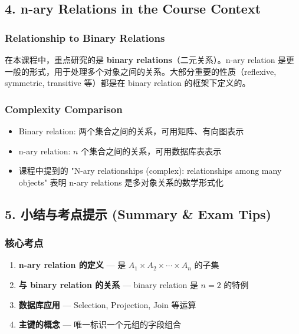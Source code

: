 \documentclass[10pt,a4paper,openany]{ctexbook}
\theoremstyle{definition}
\theoremstyle{remark}
\begin{document}
\subsection{4. n-ary Relations in the Course Context}

\subsubsection{Relationship to Binary Relations}

在本课程中，重点研究的是 \textbf{binary relations}（二元关系）。n-ary relation 是更一般的形式，用于处理多个对象之间的关系。大部分重要的性质（reflexive, symmetric, transitive 等）都是在 binary relation 的框架下定义的。
\subsubsection{Complexity Comparison}

\begin{itemize}
\item Binary relation: 两个集合之间的关系，可用矩阵、有向图表示
\item n-ary relation: $n$ 个集合之间的关系，可用数据库表表示
\item 课程中提到的 "N-ary relationships (complex): relationships among many objects" 表明 n-ary relations 是多对象关系的数学形式化

\end{itemize}

\vspace{-2pt}

\subsection{5. 小结与考点提示 (Summary \& Exam Tips)}

\subsubsection{核心考点}

\begin{enumerate}
\item \textbf{n-ary relation 的定义} — 是 $A_1 \times A_2 \times \cdots \times A_n$ 的子集
\item \textbf{与 binary relation 的关系} — binary relation 是 $n=2$ 的特例
\item \textbf{数据库应用} — Selection, Projection, Join 等运算
\item \textbf{主键的概念} — 唯一标识一个元组的字段组合

\end{enumerate}
\end{document}
